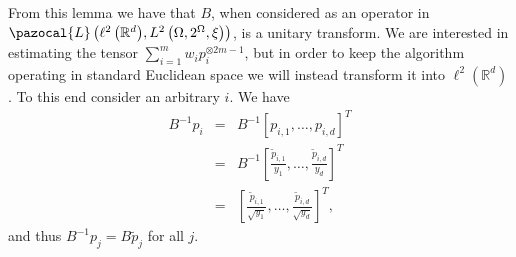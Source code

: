 \documentclass[aos,preprint]{imsart}
\def\rn{\mathbb{R}}
\def\l{\left}
\def\r{\right}
\def\sL{\pazocal{L}}
\def\lrd{{\ell^2\left( \rn^d \right)}}
\theoremstyle{plain}
\theoremstyle{defintion}
\begin{document}
From this lemma we have that $B$, when considered as an operator in $\sL \l(\lrd, L^2\left( \Omega, 2^\Omega , \xi\right)\r)$, is a unitary transform. We are interested in estimating the tensor $\sum_{i=1}^m w_i p_i^{\otimes 2m-1}$, but in order to keep the algorithm operating in standard Euclidean space we will instead transform it into $\lrd$. To this end consider an arbitrary $i$. We have
\begin{eqnarray*}
	B^{-1}p_i 
	&=& B^{-1}\left[p_{i,1} ,\ldots, p_{i,d}  \right]^T\\
	&=& B^{-1}\left[\frac{\tilde{p}_{i,1}}{y_1} ,\ldots, \frac{\tilde{p}_{i,d}}{y_d}  \right]^T\\
	       &=&\left[\frac{\tilde{p}_{i,1}}{\sqrt{y_1}} ,\ldots, \frac{\tilde{p}_{i,d}}{\sqrt{y_d}}  \right]^T,
\end{eqnarray*}
and thus $B^{-1} p_j = B \tilde{p}_j$ for all $j$.
\end{document}

